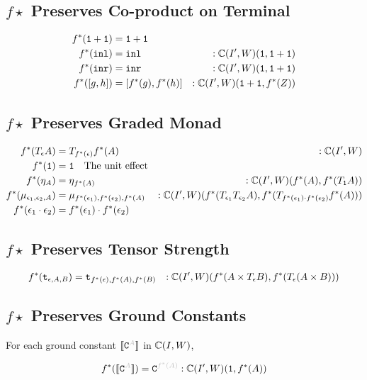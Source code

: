 {\subsection{$f\star$ Preserves Co-product on Terminal}

\begin{align}
    f^*(\texttt{1}+\texttt{1}) &= \texttt{1}+\texttt{1}\\
    f^*(\texttt{inl})  &= \texttt{inl}&:\mathbb{C}(I', W)(\texttt{1}, \texttt{1}+\texttt{1}) \\
    f^*(\texttt{inr}) &= \texttt{inr}&:\mathbb{C}(I', W)(\texttt{1}, \texttt{1}+\texttt{1}) \\
    f^*([g, h]) &= [f^*(g), f^*(h)]&:\mathbb{C}(I', W)(\texttt{1}+\texttt{1}, f^*(Z))
\end{align}

\subsection{$f\star$ Preserves Graded Monad}
\begin{align}
    f^*(T_{\epsilon}{A}) &= T_{f^*(\epsilon)}{f^*(A)}&:\mathbb{C}(I', W)\\
    f^*(\texttt{1}) &= \texttt{1} \quad\text{The unit effect}\\
    f^*(\eta_{A}) &= \eta_{f^*(A)}&:\mathbb{C}(I', W)(f^*(A), f^*(T_{\texttt{1}}{A}))\\
    f^*(\mu_{\epsilon_1, \epsilon_2, A}) &= \mu_{f^*(\epsilon_1), f^*(\epsilon_2), f^*(A)}&:\mathbb{C}(I', W)(f^*(T_{\epsilon_1}{T_{\epsilon_2}{A}}), f^*(T_{f^*(\epsilon_1)\cdot f^*(\epsilon_2)}{f^*(A)}))\\
    f^*(\epsilon_1\cdot\epsilon_2) &= f^*(\epsilon_1)\cdot f^*(\epsilon_2)\\
\end{align}

\subsection{$f\star$ Preserves Tensor Strength}
\begin{align}
    f^*(\texttt{t}_{\epsilon, A, B}) &= \texttt{t}_{f^*(\epsilon), f^*(A), f^*(B)} &: \mathbb{C}(I', W)(f^*(A\times T_{\epsilon}{B}), f^*(T_{\epsilon}{(A\times B)}))
\end{align}
\subsection{$f\star$ Preserves Ground Constants}
For each ground constant $\deno{\const{A}}$ in $\mathbb{C}(I, W)$,

\begin{align}
    f\star(\deno{\const{A}}) = \const{f\star(A)} : \cipw(\1, f\star(A))
\end{align}
}
